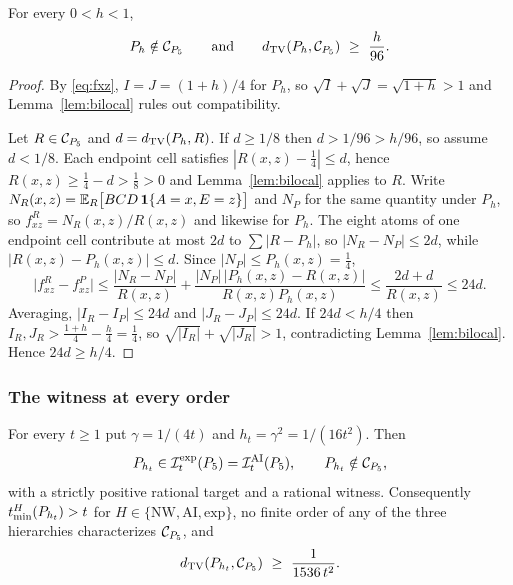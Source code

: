 \begin{corollary}\label{cor:pathdistance}
For every $0<h<1$,
\[
P_h\notin\mathcal C_{P_5}\qquad\text{and}\qquad d_{\operatorname{TV}}(P_h,\mathcal C_{P_5})\ \ge\ \frac h{96}.
\]
\end{corollary}

\begin{proof}
By \eqref{eq:fxz}, $I=J=(1+h)/4$ for $P_h$, so $\sqrt I+\sqrt J=\sqrt{1+h}>1$ and Lemma~\ref{lem:bilocal} rules out compatibility.

Let $R\in\mathcal C_{P_5}$ and $d=d_{\operatorname{TV}}(P_h,R)$. If $d\ge1/8$ then $d>1/96>h/96$, so assume $d<1/8$. Each endpoint cell satisfies $|R(x,z)-\tfrac14|\le d$, hence $R(x,z)\ge\tfrac14-d>\tfrac18>0$ and Lemma~\ref{lem:bilocal} applies to $R$. Write $N_R(x,z)=\mathbb E_R\bigl[BCD\,\mathbf 1\{A=x,E=z\}\bigr]$ and $N_P$ for the same quantity under $P_h$, so $f^R_{xz}=N_R(x,z)/R(x,z)$ and likewise for $P_h$. The eight atoms of one endpoint cell contribute at most $2d$ to $\sum|R-P_h|$, so $|N_R-N_P|\le2d$, while $|R(x,z)-P_h(x,z)|\le d$. Since $|N_P|\le P_h(x,z)=\tfrac14$,
\[
\bigl|f^R_{xz}-f^P_{xz}\bigr|
\le\frac{|N_R-N_P|}{R(x,z)}+\frac{|N_P|\,\bigl|P_h(x,z)-R(x,z)\bigr|}{R(x,z)P_h(x,z)}
\le\frac{2d+d}{R(x,z)}\le24d .
\]
Averaging, $|I_R-I_P|\le24d$ and $|J_R-J_P|\le24d$. If $24d<h/4$ then
$I_R,J_R>\tfrac{1+h}4-\tfrac h4=\tfrac14$, so $\sqrt{|I_R|}+\sqrt{|J_R|}>1$, contradicting Lemma~\ref{lem:bilocal}. Hence $24d\ge h/4$.
\end{proof}

\subsubsection{The witness at every order}\label{sec:pathwitness}

\begin{theorem}\label{thm:fivepath}
For every $t\ge1$ put $\gamma=1/(4t)$ and $h_t=\gamma^2=1/(16t^2)$. Then
\[
P_{h_t}\in\mathcal I^{\mathrm{exp}}_t(P_5)=\mathcal I^{\mathrm{AI}}_t(P_5),\qquad P_{h_t}\notin\mathcal C_{P_5} ,
\]
with a strictly positive rational target and a rational witness. Consequently $t_{\min}^H(P_{h_t})>t$ for $H\in\{\mathrm{NW},\mathrm{AI},\mathrm{exp}\}$, no finite order of any of the three hierarchies characterizes $\mathcal C_{P_5}$, and
\[
d_{\TV}(P_{h_t},\Cpath)\ \ge\ \frac1{1536\,t^2}.
\]
\end{theorem}

